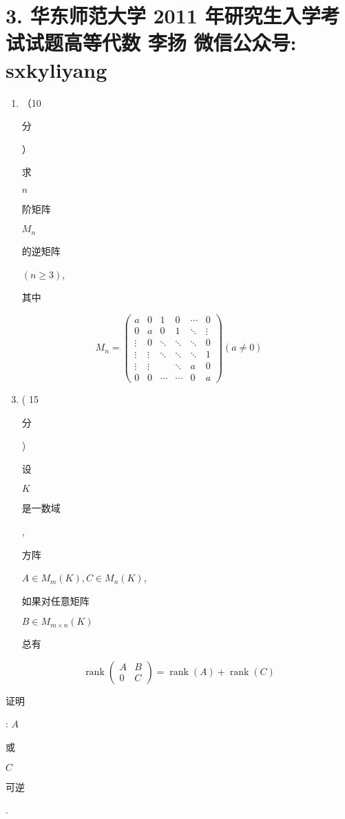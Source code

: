 \documentclass[10pt]{article}
\begin{document}
\section{3. 华东师范大学 2011 年研究生入学考试试题高等代数 
 李扬 
 微信公众号: sxkyliyang}
\begin{enumerate}
  \item （10 \begin{CJK}{UTF8}{mj}分\end{CJK}）\begin{CJK}{UTF8}{mj}求\end{CJK} $n$ \begin{CJK}{UTF8}{mj}阶矩阵\end{CJK} $M_{n}$ \begin{CJK}{UTF8}{mj}的逆矩阵\end{CJK} $(n \geq 3)$, \begin{CJK}{UTF8}{mj}其中\end{CJK}
\end{enumerate}
$$
M_{n}=\left(\begin{array}{cccccc}
a & 0 & 1 & 0 & \cdots & 0 \\
0 & a & 0 & 1 & \ddots & \vdots \\
\vdots & 0 & \ddots & \ddots & \ddots & 0 \\
\vdots & \vdots & \ddots & \ddots & \ddots & 1 \\
\vdots & \vdots & & \ddots & a & 0 \\
0 & 0 & \cdots & \cdots & 0 & a
\end{array}\right)(a \neq 0)
$$

\begin{enumerate}
  \setcounter{enumi}{2}
  \item ( 15 \begin{CJK}{UTF8}{mj}分\end{CJK}) \begin{CJK}{UTF8}{mj}设\end{CJK} $K$ \begin{CJK}{UTF8}{mj}是一数域\end{CJK}, \begin{CJK}{UTF8}{mj}方阵\end{CJK} $A \in M_{m}(K), C \in M_{n}(K)$, \begin{CJK}{UTF8}{mj}如果对任意矩阵\end{CJK} $B \in M_{m \times n}(K)$ \begin{CJK}{UTF8}{mj}总有\end{CJK}
\end{enumerate}
$$
\operatorname{rank}\left(\begin{array}{cc}
A & B \\
0 & C
\end{array}\right)=\operatorname{rank}(A)+\operatorname{rank}(C)
$$
\begin{CJK}{UTF8}{mj}证明\end{CJK}: $A$ \begin{CJK}{UTF8}{mj}或\end{CJK} $C$ \begin{CJK}{UTF8}{mj}可逆\end{CJK}.
\end{document}
